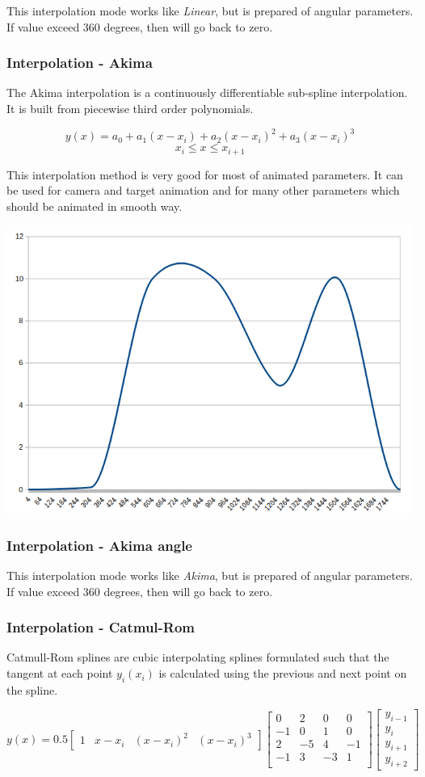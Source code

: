 This interpolation mode works like \emph{Linear}, but is prepared of angular
parameters. If value exceed 360 degrees, then will go back to zero.

\subsubsection{Interpolation - Akima}\label{interpolation-akima}

The Akima interpolation is a continuously differentiable sub-spline
interpolation. It is built from piecewise third order polynomials.

\[ y(x) = a_0 + a_1 (x - x_i) + a_2 (x - x_i)^2 + a_3 (x - x_i)^3\] \[x_i  \leq
x \leq x_{i+1}\]

This interpolation method is very good for most of animated parameters. It can
be used for camera and target animation and for many other parameters which
should be animated in smooth way.

\includegraphics[width=0.5\linewidth]{img/manual/media/interpolation_akima.png}

\subsubsection{Interpolation - Akima angle}\label{interpolation-akima-angle}

This interpolation mode works like \emph{Akima}, but is prepared of angular
parameters. If value exceed 360 degrees, then will go back to zero.

\subsubsection{Interpolation - Catmul-Rom}\label{interpolation-catmul-rom}

Catmull-Rom splines are cubic interpolating splines formulated such that the
tangent at each point $ y_i(x_i) $ is calculated using the previous and next
point on the spline.

\[ y(x) = 0.5 \begin{bmatrix} 1 & x-x_i & (x-x_i)^2 & (x-x_i)^3\end{bmatrix}
\begin{bmatrix} 0 & 2 & 0 & 0 \\ -1 & 0 & 1 & 0 \\ 2 & -5 & 4 & -1 \\ -1 & 3 &
-3 & 1 \\ \end{bmatrix} \begin{bmatrix} y_{i-1} \\ y_i \\ y_{i+1} \\ y_{i+2}
\end{bmatrix} \]

